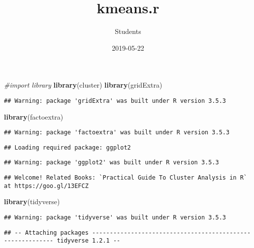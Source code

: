 \documentclass[]{article}
\title{kmeans.r}
\author{Students}
\date{2019-05-22}
\newenvironment{Shaded}{\begin{snugshade}}{\end{snugshade}}
\newcommand{\CommentTok}[1]{\textcolor[rgb]{0.56,0.35,0.01}{\textit{#1}}}
\newcommand{\KeywordTok}[1]{\textcolor[rgb]{0.13,0.29,0.53}{\textbf{#1}}}
\newcommand{\NormalTok}[1]{#1}
\begin{document}
\maketitle

\begin{Shaded}
\begin{Highlighting}[]
\CommentTok{#import library}
\KeywordTok{library}\NormalTok{(cluster)}
\KeywordTok{library}\NormalTok{(gridExtra)}
\end{Highlighting}
\end{Shaded}

\begin{verbatim}
## Warning: package 'gridExtra' was built under R version 3.5.3
\end{verbatim}

\begin{Shaded}
\begin{Highlighting}[]
\KeywordTok{library}\NormalTok{(factoextra)}
\end{Highlighting}
\end{Shaded}

\begin{verbatim}
## Warning: package 'factoextra' was built under R version 3.5.3
\end{verbatim}

\begin{verbatim}
## Loading required package: ggplot2
\end{verbatim}

\begin{verbatim}
## Warning: package 'ggplot2' was built under R version 3.5.3
\end{verbatim}

\begin{verbatim}
## Welcome! Related Books: `Practical Guide To Cluster Analysis in R` at https://goo.gl/13EFCZ
\end{verbatim}

\begin{Shaded}
\begin{Highlighting}[]
\KeywordTok{library}\NormalTok{(tidyverse)}
\end{Highlighting}
\end{Shaded}

\begin{verbatim}
## Warning: package 'tidyverse' was built under R version 3.5.3
\end{verbatim}

\begin{verbatim}
## -- Attaching packages ----------------------------------------------------------- tidyverse 1.2.1 --
\end{verbatim}
\end{document}
